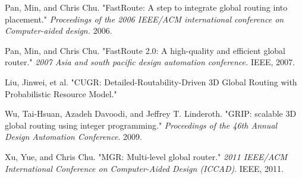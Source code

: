 \documentclass[conference]{IEEEtran}
\begin{document}
\begin{thebibliography}{00}
     Pan, Min, and Chris Chu. "FastRoute: A step to integrate global routing into placement." \textit{Proceedings of the 2006 IEEE/ACM international conference on Computer-aided design.} 2006.

     Pan, Min, and Chris Chu. "FastRoute 2.0: A high-quality and efficient global router." \textit{2007 Asia and south pacific design automation conference.} IEEE, 2007.

     Liu, Jinwei, et al. "CUGR: Detailed-Routability-Driven 3D Global Routing with Probabilistic Resource Model."

     Wu, Tai-Hsuan, Azadeh Davoodi, and Jeffrey T. Linderoth. "GRIP: scalable 3D global routing using integer programming." \textit{Proceedings of the 46th Annual Design Automation Conference}. 2009.

     Xu, Yue, and Chris Chu. "MGR: Multi-level global router." \textit{2011 IEEE/ACM International Conference on Computer-Aided Design (ICCAD)}. IEEE, 2011.

\end{thebibliography}
\end{document}
